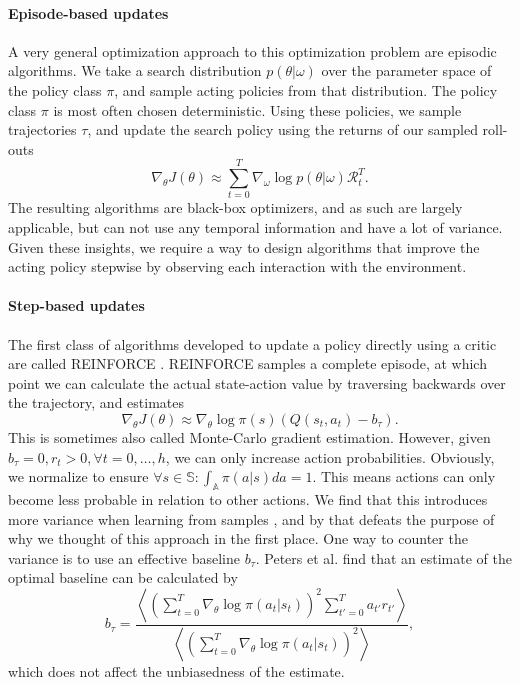 \documentclass[final]{IEEEtran}
\begin{document}
\paragraph{Episode-based updates} 
A very general optimization approach to this optimization problem are episodic algorithms. 
We take a search distribution $p(\theta|\omega)$ over the parameter space of the policy class $\pi$, and sample acting policies from that distribution. 
The policy class $\pi$ is most often chosen deterministic. 
Using these policies, we sample trajectories $\tau$, and update the search policy using the returns of our sampled roll-outs
\begin{equation}
	\nabla_\theta J(\theta) \approx \sum_{t=0}^T \nabla_\omega \log p(\theta|\omega) \mathcal{R}_t^T.
\end{equation}
The resulting algorithms are black-box optimizers, and as such are largely applicable, but can not use any temporal information and have a lot of variance.
Given these insights, we require a way to design algorithms that improve the acting policy stepwise by observing each interaction with the environment.

\paragraph{Step-based updates}
The first class of algorithms developed to update a policy directly using a critic are called REINFORCE \cite{Williams92simplestatistical}.
REINFORCE samples a complete episode, at which point we can calculate the actual state-action value by traversing backwards over the trajectory, and estimates
\begin{equation}
	\nabla_\theta J(\theta) \approx \nabla_\theta\log\pi(s) \left(Q(s_t,a_t) - b_\tau \right).
	\label{eqn:reinforce}
\end{equation}
This is sometimes also called Monte-Carlo gradient estimation. 
However, given $b_\tau = 0, r_t > 0, \forall t=0,\dots,h$, we can only increase action probabilities. 
Obviously, we normalize to ensure $\forall s \in \mathbb{S}: \int_\mathbb{A}{\pi(a|s)da} = 1$. 
This means actions can only become less probable in relation to other actions. 
We find that this introduces more variance when learning from samples \cite{Sutton:1999:PGM:3009657.3009806}, and by that defeats the purpose of why we thought of this approach in the first place. 
One way to counter the variance is to use an effective baseline $b_\tau$.
Peters et al. \cite{4867} find that an estimate of the optimal baseline can be calculated by
\begin{equation}
	b_\tau = \frac
		{\left\langle 
			\left(\sum_{t=0}^T \nabla_\theta \log\pi(a_t|s_t) \right)^2 \sum_{t'=0}^T a_{t'} r_{t'} 
		\right\rangle}
		{\left\langle
			\left(\sum_{t=0}^T \nabla_\theta \log\pi(a_t|s_t) \right)^2
		\right\rangle},
\end{equation}
which does not affect the unbiasedness of the estimate.
\end{document}
